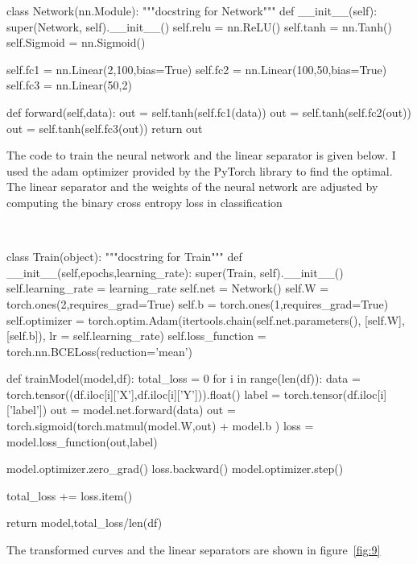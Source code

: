 \documentclass[12pt]{report}
\begin{document}
\begin{python}
class Network(nn.Module):
	"""docstring for Network"""
	def __init__(self):
		super(Network, self).__init__()
		self.relu = nn.ReLU()
		self.tanh = nn.Tanh()
		self.Sigmoid = nn.Sigmoid()
		
		self.fc1 = nn.Linear(2,100,bias=True)
		self.fc2 = nn.Linear(100,50,bias=True)
		self.fc3 = nn.Linear(50,2)
	
	def forward(self,data):
		out = self.tanh(self.fc1(data))
		out = self.tanh(self.fc2(out))
		out = self.tanh(self.fc3(out))
		return out
\end{python}

The code to train the neural network and the linear separator is given below. I used the adam optimizer provided by the PyTorch library to find the optimal. The linear separator and the weights of the neural network are adjusted by computing the binary cross entropy loss in classification

\

\begin{python}
	class Train(object):
		"""docstring for Train"""
		def __init__(self,epochs,learning_rate):
			super(Train, self).__init__()
			self.learning_rate = learning_rate
			self.net = Network()
			self.W = torch.ones(2,requires_grad=True)
			self.b = torch.ones(1,requires_grad=True)
			self.optimizer = torch.optim.Adam(itertools.chain(self.net.parameters(), [self.W], [self.b]), lr = self.learning_rate)
			self.loss_function =  torch.nn.BCELoss(reduction='mean')
			
	def trainModel(model,df):
		total_loss = 0
		for i in range(len(df)):
		data = torch.tensor((df.iloc[i]['X'],df.iloc[i]['Y'])).float()
		label = torch.tensor(df.iloc[i]['label'])
		out = model.net.forward(data)
		out = torch.sigmoid(torch.matmul(model.W,out) + model.b )
		loss = model.loss_function(out,label)
		
		model.optimizer.zero_grad()
		loss.backward()
		model.optimizer.step()
		
		total_loss += loss.item()
		
		return model,total_loss/len(df)
\end{python}

The transformed curves and the linear separators are shown in figure~\ref{fig:9}
\end{document}
